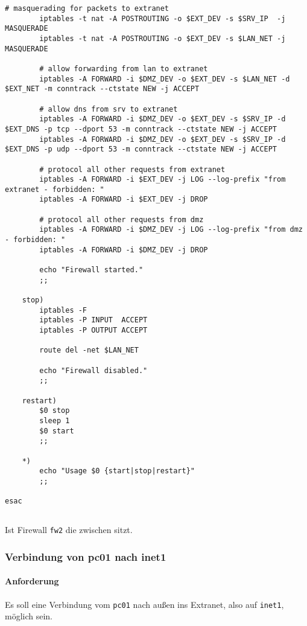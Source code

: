 \begin{lstlisting}[label=lst:masq,caption={Masquerading.}]
        # masquerading for packets to extranet
        iptables -t nat -A POSTROUTING -o $EXT_DEV -s $SRV_IP  -j MASQUERADE
        iptables -t nat -A POSTROUTING -o $EXT_DEV -s $LAN_NET -j MASQUERADE

        # allow forwarding from lan to extranet
        iptables -A FORWARD -i $DMZ_DEV -o $EXT_DEV -s $LAN_NET -d $EXT_NET -m conntrack --ctstate NEW -j ACCEPT

        # allow dns from srv to extranet
        iptables -A FORWARD -i $DMZ_DEV -o $EXT_DEV -s $SRV_IP -d $EXT_DNS -p tcp --dport 53 -m conntrack --ctstate NEW -j ACCEPT
        iptables -A FORWARD -i $DMZ_DEV -o $EXT_DEV -s $SRV_IP -d $EXT_DNS -p udp --dport 53 -m conntrack --ctstate NEW -j ACCEPT

        # protocol all other requests from extranet
        iptables -A FORWARD -i $EXT_DEV -j LOG --log-prefix "from extranet - forbidden: "
        iptables -A FORWARD -i $EXT_DEV -j DROP

        # protocol all other requests from dmz
        iptables -A FORWARD -i $DMZ_DEV -j LOG --log-prefix "from dmz - forbidden: "
        iptables -A FORWARD -i $DMZ_DEV -j DROP

        echo "Firewall started."
        ;;

    stop)
        iptables -F
        iptables -P INPUT  ACCEPT
        iptables -P OUTPUT ACCEPT

        route del -net $LAN_NET

        echo "Firewall disabled."
        ;;

    restart)
        $0 stop
        sleep 1
        $0 start
        ;;

    *)
        echo "Usage $0 {start|stop|restart}"
        ;;

esac
\end{lstlisting}


\subsection{\fwb}

Ist Firewall {\tt fw2} die zwischen \fwb sitzt.

\subsubsection{Verbindung von pc01 nach inet1}

\paragraph{Anforderung} Es soll eine Verbindung vom {\tt pc01} nach
außen ins Extranet, also auf {\tt inet1}, möglich sein.


